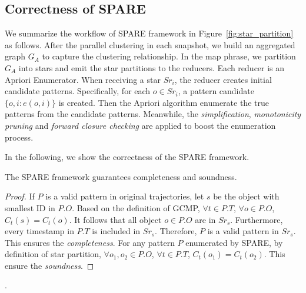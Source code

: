 \subsection{Correctness of SPARE}
We summarize the workflow of SPARE framework in Figure~\ref{fig:star_partition} as follows. After the parallel clustering in each snapshot, we build an aggregated graph $G_A$ to capture the clustering relationship. In the map phrase, we partition $G_A$ into stars and emit the star partitions to the reducers. Each reducer is an Apriori Enumerator. When receiving a star $Sr_i$, the reducer creates initial candidate patterns. Specifically, for each $o \in Sr_i$, a pattern candidate $\{o,i: e(o,i)\}$ is created. Then the Apriori algorithm enumerate the true patterns from the candidate patterns. Meanwhile, the \emph{simplification}, \emph{monotonicity pruning} and \emph{forward closure checking} are applied to boost the enumeration process.




In the following, we show the correctness of the SPARE framework.
\begin{theorem}
\label{THM:SPM_CORRECT}
The SPARE framework guarantees completeness and soundness.
\end{theorem}
\begin{proof}
If $P$ is a valid pattern in original trajectories, 
let $s$ be the object with smallest ID in $P.O$. 
Based on the definition of GCMP, $\forall t \in P.T$, $\forall o \in P.O$, $C_t(s) = C_t(o)$.
It follows that all object $o \in P.O$ are in $Sr_s$. 
Furthermore, every timestamp in $P.T$ is included
in $Sr_s$. Therefore, $P$ is a valid pattern in $Sr_s$. This ensures the \emph{completeness}. For any pattern $P$ enumerated by SPARE, by definition of star partition, $\forall o_1, o_2 \in P.O$, $\forall t \in P.T$, $C_t(o_1) = C_t(o_2)$. This ensure the \emph{soundness}.
\end{proof}.

